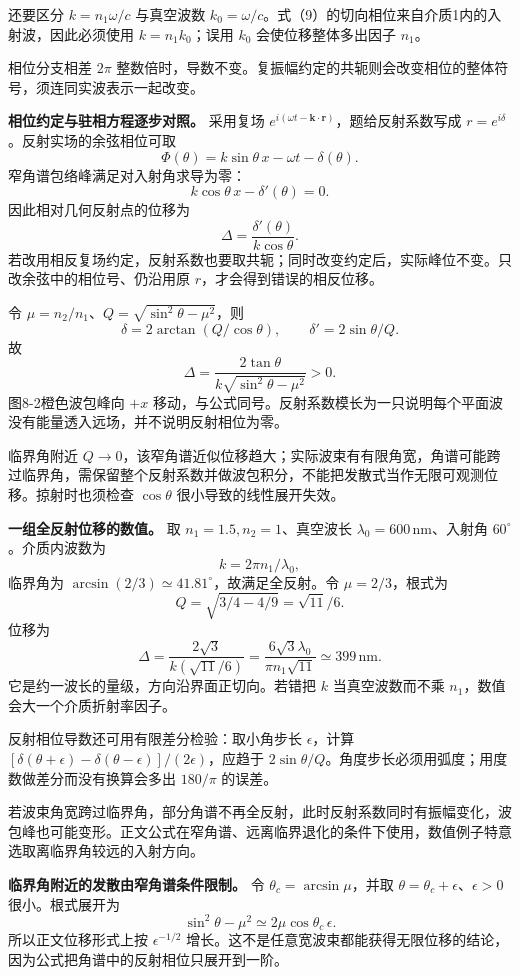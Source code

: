 \documentclass[12pt,a4paper,UTF8]{ctexart}
\begin{document}
还要区分 \(k=n_1\omega/c\) 与真空波数
\(k_0=\omega/c\)。式（9）的切向相位来自介质1内的入射波，因此必须使用
\(k=n_1k_0\)；误用 \(k_0\) 会使位移整体多出因子 \(n_1\)。

相位分支相差 \(2\pi\)
整数倍时，导数不变。复振幅约定的共轭则会改变相位的整体符号，须连同实波表示一起改变。

\textbf{相位约定与驻相方程逐步对照。} 采用复场
\(e^{i(\omega t-\bm k\cdot\bm r)}\)，题给反射系数写成
\(r=e^{i\delta}\)。反射实场的余弦相位可取 \[
\Phi(\theta)=k\sin\theta\,x-\omega t-\delta(\theta).
\] 窄角谱包络峰满足对入射角求导为零： \[
k\cos\theta\,x-\delta'(\theta)=0.
\] 因此相对几何反射点的位移为 \[
\Delta=\frac{\delta'(\theta)}{k\cos\theta}.
\]
若改用相反复场约定，反射系数也要取共轭；同时改变约定后，实际峰位不变。只改余弦中的相位号、仍沿用原
\(r\)，才会得到错误的相反位移。

令 \(\mu=n_2/n_1\)、\(Q=\sqrt{\sin^2\theta-\mu^2}\)，则 \[
\delta=2\arctan(Q/\cos\theta),\qquad
\delta'=2\sin\theta/Q.
\] 故 \[
\Delta=\frac{2\tan\theta}{k\sqrt{\sin^2\theta-\mu^2}}>0.
\] 图8-2橙色波包峰向 \(+x\)
移动，与公式同号。反射系数模长为一只说明每个平面波没有能量透入远场，并不说明反射相位为零。

临界角附近
\(Q\to0\)，该窄角谱近似位移趋大；实际波束有有限角宽，角谱可能跨过临界角，需保留整个反射系数并做波包积分，不能把发散式当作无限可观测位移。掠射时也须检查
\(\cos\theta\) 很小导致的线性展开失效。

\textbf{一组全反射位移的数值。} 取 \(n_1=1.5,n_2=1\)、真空波长
\(\lambda_0=600\,\mathrm{nm}\)、入射角 \(60^\circ\)。介质内波数为 \[
k=2\pi n_1/\lambda_0,
\] 临界角为 \(\arcsin(2/3)\simeq41.81^\circ\)，故满足全反射。令
\(\mu=2/3\)，根式为 \[
Q=\sqrt{3/4-4/9}=\sqrt{11}/6.
\] 位移为 \[
\Delta=\frac{2\sqrt3}{k(\sqrt{11}/6)}
=\frac{6\sqrt3\lambda_0}{\pi n_1\sqrt{11}}
\simeq399\,\mathrm{nm}.
\] 它是约一波长的量级，方向沿界面正切向。若错把 \(k\) 当真空波数而不乘
\(n_1\)，数值会大一个介质折射率因子。

反射相位导数还可用有限差分检验：取小角步长 \(\epsilon\)，计算
\([\delta(\theta+\epsilon)-\delta(\theta-\epsilon)]/(2\epsilon)\)，应趋于
\(2\sin\theta/Q\)。角度步长必须用弧度；用度数做差分而没有换算会多出
\(180/\pi\) 的误差。

若波束角宽跨过临界角，部分角谱不再全反射，此时反射系数同时有振幅变化，波包峰也可能变形。正文公式在窄角谱、远离临界退化的条件下使用，数值例子特意选取离临界角较远的入射方向。

\textbf{临界角附近的发散由窄角谱条件限制。} 令
\(\theta_c=\arcsin\mu\)，并取
\(\theta=\theta_c+\epsilon\)、\(\epsilon>0\) 很小。根式展开为 \[
\sin^2\theta-\mu^2\simeq2\mu\cos\theta_c\,\epsilon.
\] 所以正文位移形式上按 \(\epsilon^{-1/2}\)
增长。这不是任意宽波束都能获得无限位移的结论，因为公式把角谱中的反射相位只展开到一阶。
\end{document}

